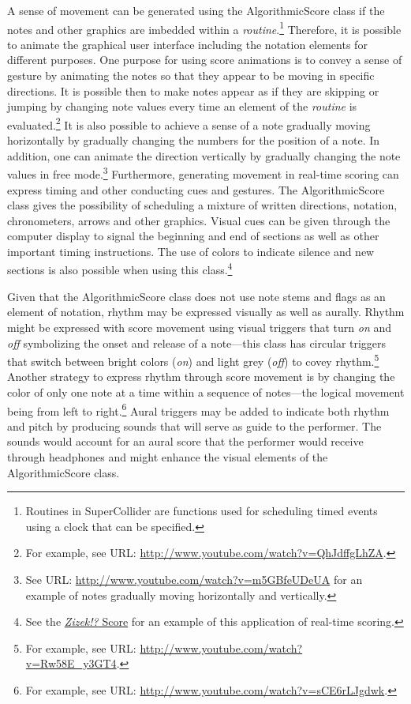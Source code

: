 A sense of movement can be generated using the AlgorithmicScore class if the notes and other graphics are imbedded within a \emph{routine}.\footnote{Routines in SuperCollider are functions used for scheduling timed events using a clock that can be specified.} Therefore, it is possible to animate the graphical user interface including the notation elements for different purposes. One purpose for using score animations is to convey a sense of gesture by animating the notes so that they appear to be moving in specific directions. It is possible then to make notes appear as if they are skipping or jumping by changing note values every time an element of the \emph{routine} is evaluated.\footnote{For example, see URL: \href{http://www.youtube.com/watch?v=QhJdffgLhZA}{http://www.youtube.com/watch?v=QhJdffgLhZA}.} It is also possible to achieve a sense of a note gradually moving horizontally by gradually changing the numbers for the position of a note. In addition, one can animate the direction vertically by gradually changing the note values in free mode.\footnote{See URL: \href{http://www.youtube.com/watch?v=m5GBfeUDeUA}{http://www.youtube.com/watch?v=m5GBfeUDeUA} for an example of notes gradually moving horizontally and vertically.} Furthermore, generating movement in real-time scoring can express timing and other conducting cues and gestures. The AlgorithmicScore class gives the possibility of scheduling a mixture of written directions, notation, chronometers, arrows and other graphics.  Visual cues can be given through the computer display to signal the beginning and end of sections as well as other important timing instructions. The use of colors to indicate silence and new sections is also possible when using this class.\footnote{See the \href{http://www.youtube.com/watch?v=m5GBfeUDeUA}{\emph{Zizek!?} Score} for an example of this application of real-time scoring.} 

Given that the AlgorithmicScore class does not use note stems and flags as an element of notation, rhythm may be expressed visually as well as aurally. Rhythm might be expressed with score movement using visual triggers that turn \emph{on} and \emph{off} symbolizing the onset and release of a note---this class has circular triggers that switch between bright colors (\emph{on}) and light grey (\emph{off}) to covey rhythm.\footnote{For example, see URL: \href{http://www.youtube.com/watch?v=Rw58E_y3GT4}{http://www.youtube.com/watch?v=Rw58E\_y3GT4}.} Another strategy to express rhythm through score movement is by changing the color of only one note at a time within a sequence of notes---the logical movement being from left to right.\footnote{For example, see URL: \href{http://www.youtube.com/watch?v=sCE6rLJgdwk}{http://www.youtube.com/watch?v=sCE6rLJgdwk}.} Aural triggers may be added to indicate both rhythm and pitch by producing sounds that will serve as guide to the performer. The sounds would account for an aural score that the performer would receive through headphones and might enhance the visual elements of the AlgorithmicScore class.

